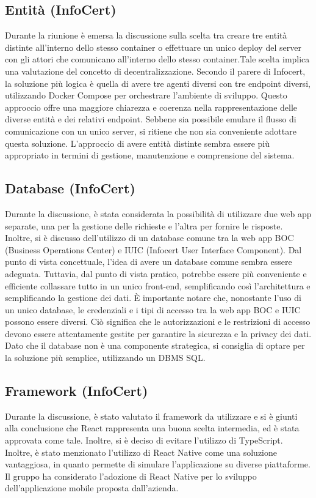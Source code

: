 \subsection{Entità (InfoCert) }
Durante la riunione è emersa la discussione sulla scelta tra creare tre entità distinte all'interno dello stesso container o effettuare un unico deploy del server con gli attori che comunicano all'interno dello stesso container.Tale scelta implica una valutazione del concetto di decentralizzazione.
Secondo il parere di Infocert, la soluzione più logica è quella di avere tre agenti diversi con tre endpoint diversi, utilizzando Docker Compose per orchestrare l'ambiente di sviluppo. Questo approccio offre una maggiore chiarezza e coerenza nella rappresentazione delle diverse entità e dei relativi endpoint.
Sebbene sia possibile emulare il flusso di comunicazione con un unico server, si ritiene che non sia conveniente adottare questa soluzione. L'approccio di avere entità distinte sembra essere più appropriato in termini di gestione, manutenzione e comprensione del sistema.


\subsection{Database (InfoCert)}
Durante la discussione, è stata considerata la possibilità di utilizzare due web app separate, una per la gestione delle richieste e l'altra per fornire le risposte. Inoltre, si è discusso dell'utilizzo di un database comune tra la web app BOC (Business Operations Center) e IUIC (Infocert User Interface Component).
Dal punto di vista concettuale, l'idea di avere un database comune sembra essere adeguata. Tuttavia, dal punto di vista pratico, potrebbe essere più conveniente e efficiente collassare tutto in un unico front-end, semplificando così l'architettura e semplificando la gestione dei dati.
È importante notare che, nonostante l'uso di un unico database, le credenziali e i tipi di accesso tra la web app BOC e IUIC possono essere diversi. Ciò significa che le autorizzazioni e le restrizioni di accesso devono essere attentamente gestite per garantire la sicurezza e la privacy dei dati.
Dato che il database non è una componente strategica, si consiglia di optare per la soluzione più semplice, utilizzando un DBMS SQL.

\subsection{Framework (InfoCert)}
Durante la discussione, è stato valutato il framework da utilizzare e si è giunti alla conclusione che React rappresenta una buona scelta intermedia, ed è stata approvata come tale. Inoltre, si è deciso di evitare l'utilizzo di TypeScript. Inoltre, è stato menzionato l'utilizzo di React Native come una soluzione vantaggiosa, in quanto permette di simulare l'applicazione su diverse piattaforme.
Il gruppo ha considerato l'adozione di React Native per lo sviluppo dell'applicazione mobile proposta dall'azienda.
